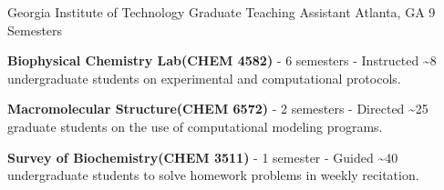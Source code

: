 \begin{cventries}
  \cventry
    {Georgia Institute of Technology} %
    {Graduate Teaching Assistant} %
    {Atlanta, GA} %
    {9 Semesters} %
    {
      \begin{cvitems} %
        \item {\textbf{Biophysical Chemistry Lab{\scriptsize (CHEM 4582)}} - 6 semesters - Instructed \textasciitilde8 undergraduate students on experimental and computational protocols.}
        \item {\textbf{Macromolecular Structure{\scriptsize (CHEM 6572)}} - 2 semesters - Directed \textasciitilde25 graduate students on the use of computational modeling programs.}
        \item {\textbf{Survey of Biochemistry{\scriptsize (CHEM 3511)}} - 1 semester - Guided \textasciitilde40 undergraduate students to solve homework problems in weekly recitation.}
      \end{cvitems}
    }


\vspace{-4.0mm}
\end{cventries}

